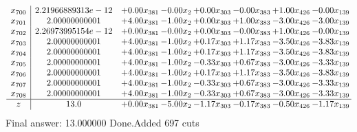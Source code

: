 \documentclass[8pt]{article}
\begin{document}
\[\begin{array}{c| c c@{\hskip 2pt} c@{\hskip 2pt} c@{\hskip 2pt} c@{\hskip 2pt} c@{\hskip 2pt} c@{\hskip 2pt} }
 x_{700}   &  2.21966889313e-12 & +  0.00 x_{381} & -0.00 x_{2} & +  0.00 x_{303} & -0.00 x_{383} & +  1.00 x_{426} & -0.00 x_{139}\\
 x_{701}   &  2.00000000001 & +  4.00 x_{381} & -1.00 x_{2} & +  0.00 x_{303} & +  1.00 x_{383} & -3.00 x_{426} & -3.00 x_{139}\\
 x_{702}   &  2.26973995154e-12 & +  0.00 x_{381} & -0.00 x_{2} & +  0.00 x_{303} & -0.00 x_{383} & +  1.00 x_{426} & -0.00 x_{139}\\
 x_{703}   &  2.00000000001 & +  4.00 x_{381} & -1.00 x_{2} & +  0.17 x_{303} & +  1.17 x_{383} & -3.50 x_{426} & -3.83 x_{139}\\
 x_{704}   &  2.00000000001 & +  4.00 x_{381} & -1.00 x_{2} & +  0.17 x_{303} & +  1.17 x_{383} & -3.50 x_{426} & -3.83 x_{139}\\
 x_{705}   &  2.00000000001 & +  4.00 x_{381} & -1.00 x_{2} & -0.33 x_{303} & +  0.67 x_{383} & -3.00 x_{426} & -3.33 x_{139}\\
 x_{706}   &  2.00000000001 & +  4.00 x_{381} & -1.00 x_{2} & +  0.17 x_{303} & +  1.17 x_{383} & -3.50 x_{426} & -3.83 x_{139}\\
 x_{707}   &  2.00000000001 & +  4.00 x_{381} & -1.00 x_{2} & -0.33 x_{303} & +  0.67 x_{383} & -3.00 x_{426} & -3.33 x_{139}\\
 x_{708}   &  2.00000000001 & +  4.00 x_{381} & -1.00 x_{2} & -0.33 x_{303} & +  0.67 x_{383} & -3.00 x_{426} & -3.33 x_{139}\\
\hline
z    &  13.0 & +  0.00 x_{381} & -5.00 x_{2} & -1.17 x_{303} & -0.17 x_{383} & -0.50 x_{426} & -1.17 x_{139}\\
\end{array}\]
 Final answer: 13.000000 
Done.Added 697 cuts 
\end{document}
